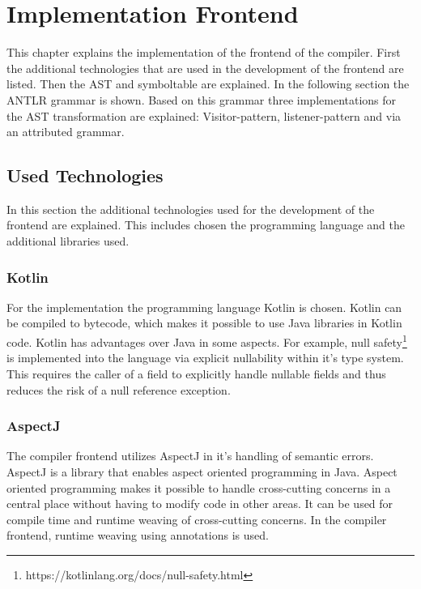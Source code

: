 \chapter{Implementation Frontend}

This chapter explains the implementation of the frontend of the compiler. First the additional technologies that are used in the development of the frontend are listed. Then the AST and symboltable are explained. In the following section the ANTLR grammar is shown. Based on this grammar three implementations for the AST transformation are explained: Visitor-pattern, listener-pattern and via an attributed grammar. 

\section{Used Technologies}

In this section the additional technologies used for the development of the frontend are explained. This includes chosen the programming language and the additional libraries used.

\subsection{Kotlin}

For the implementation the programming language Kotlin is chosen. Kotlin can be compiled to bytecode, which makes it possible to use Java libraries in Kotlin code. Kotlin has advantages over Java in some aspects. For example, null safety\footnote{https://kotlinlang.org/docs/null-safety.html} is implemented into the language via explicit nullability within it's type system. This requires the caller of a field to explicitly handle nullable fields and thus reduces the risk of a null reference exception. 

\subsection{AspectJ}

The compiler frontend utilizes AspectJ in it's handling of semantic errors. AspectJ is a library that enables aspect oriented programming in Java. Aspect oriented programming makes it possible to handle cross-cutting concerns in a central place without having to modify code in other areas. It can be used for compile time and runtime weaving of cross-cutting concerns. In the compiler frontend, runtime weaving using annotations is used.  

